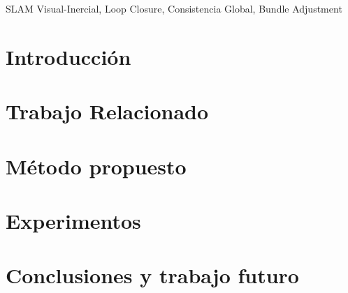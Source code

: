 \documentclass[conference]{IEEEtran}
\begin{document}
\maketitle

\begin{abstract}

\end{abstract}

\begin{IEEEkeywords}
SLAM Visual-Inercial, Loop Closure, Consistencia Global, Bundle Adjustment
\end{IEEEkeywords}

\IEEEpeerreviewmaketitle

\section{Introducción}
\label{sec:introduction}


\section{Trabajo Relacionado}
\label{sec:related}


\section{Método propuesto}
\label{sec:method}


\section{Experimentos}
\label{sec:experiments}


\section{Conclusiones y trabajo futuro}
\label{sec:conclusions}


%

%



\end{document}
